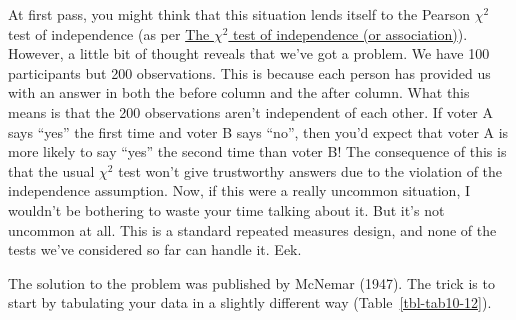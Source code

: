 \documentclass[
  a4paper,
]{book}
\begin{document}
At first pass, you might think that this situation lends itself to the
Pearson \(\chi^2\) test of independence (as per
\protect\hyperlink{the-chi2-test-of-independence-or-association}{The
\(\chi^2\) test of independence (or association)}). However, a little
bit of thought reveals that we've got a problem. We have 100
participants but 200 observations. This is because each person has
provided us with an answer in both the before column and the after
column. What this means is that the 200 observations aren't independent
of each other. If voter A says ``yes'' the first time and voter B says
``no'', then you'd expect that voter A is more likely to say ``yes'' the
second time than voter B! The consequence of this is that the usual
\(\chi^2\) test won't give trustworthy answers due to the violation of
the independence assumption. Now, if this were a really uncommon
situation, I wouldn't be bothering to waste your time talking about it.
But it's not uncommon at all. This is a standard repeated measures
design, and none of the tests we've considered so far can handle it.
Eek.

The solution to the problem was published by McNemar (1947). The trick
is to start by tabulating your data in a slightly different way
(Table~\ref{tbl-tab10-12}).

\hypertarget{tbl-tab10-12}{}
 
  \providecommand{\huxb}[2]{\arrayrulecolor[RGB]{#1}\global\arrayrulewidth=#2pt}
  \providecommand{\huxvb}[2]{\color[RGB]{#1}\vrule width #2pt}
  \providecommand{\huxtpad}[1]{\rule{0pt}{#1}}
  \providecommand{\huxbpad}[1]{\rule[-#1]{0pt}{#1}}
\end{document}
